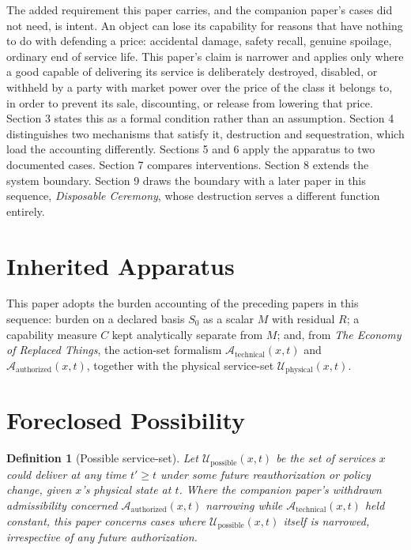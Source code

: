 \documentclass[11pt]{article}
\newtheorem{definition}{Definition}[section]
\begin{document}
The added requirement this paper carries, and the companion paper's cases did not need, is intent. An object can lose its capability for reasons that have nothing to do with defending a price: accidental damage, safety recall, genuine spoilage, ordinary end of service life. This paper's claim is narrower and applies only where a good capable of delivering its service is deliberately destroyed, disabled, or withheld by a party with market power over the price of the class it belongs to, in order to prevent its sale, discounting, or release from lowering that price. Section 3 states this as a formal condition rather than an assumption. Section 4 distinguishes two mechanisms that satisfy it, destruction and sequestration, which load the accounting differently. Sections 5 and 6 apply the apparatus to two documented cases. Section 7 compares interventions. Section 8 extends the system boundary. Section 9 draws the boundary with a later paper in this sequence, \emph{Disposable Ceremony}, whose destruction serves a different function entirely.

\section{Inherited Apparatus}

This paper adopts the burden accounting of the preceding papers in this sequence: burden on a declared basis $S_0$ as a scalar $M$ with residual $R$; a capability measure $C$ kept analytically separate from $M$; and, from \emph{The Economy of Replaced Things}, the action-set formalism $\mathcal{A}_{\text{technical}}(x,t)$ and $\mathcal{A}_{\text{authorized}}(x,t)$, together with the physical service-set $\mathcal{U}_{\text{physical}}(x,t)$.

\section{Foreclosed Possibility}

\begin{definition}[Possible service-set]
Let $\mathcal{U}_{\text{possible}}(x,t)$ be the set of services $x$ could deliver at any time $t' \geq t$ under some future reauthorization or policy change, given $x$'s physical state at $t$. Where the companion paper's withdrawn admissibility concerned $\mathcal{A}_{\text{authorized}}(x,t)$ narrowing while $\mathcal{A}_{\text{technical}}(x,t)$ held constant, this paper concerns cases where $\mathcal{U}_{\text{possible}}(x,t)$ itself is narrowed, irrespective of any future authorization.
\end{definition}
\end{document}
